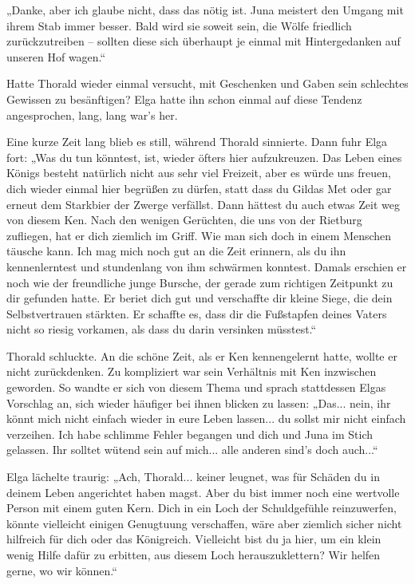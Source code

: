 „Danke, aber ich glaube nicht, dass das nötig ist. Juna meistert den Umgang mit ihrem Stab immer besser. Bald wird sie soweit sein, die Wölfe friedlich zurückzutreiben – sollten diese sich überhaupt je einmal mit Hintergedanken auf unseren Hof wagen.“

Hatte Thorald wieder einmal versucht, mit Geschenken und Gaben sein schlechtes Gewissen zu besänftigen? Elga hatte ihn schon einmal auf diese Tendenz angesprochen, lang, lang war’s her.

Eine kurze Zeit lang blieb es still, während Thorald sinnierte. Dann fuhr Elga fort: „Was du tun könntest, ist, wieder öfters hier aufzukreuzen. Das Leben eines Königs besteht natürlich nicht aus sehr viel Freizeit, aber es würde uns freuen, dich wieder einmal hier begrüßen zu dürfen, statt dass du Gildas Met oder gar erneut dem Starkbier der Zwerge verfällst. Dann hättest du auch etwas Zeit weg von diesem Ken. Nach den wenigen Gerüchten, die uns von der Rietburg zufliegen, hat er dich ziemlich im Griff. Wie man sich doch in einem Menschen täusche kann. Ich mag mich noch gut an die Zeit erinnern, als du ihn kennenlerntest und stundenlang von ihm schwärmen konntest. Damals erschien er noch wie der freundliche junge Bursche, der gerade zum richtigen Zeitpunkt zu dir gefunden hatte. Er beriet dich gut und verschaffte dir kleine Siege, die dein Selbstvertrauen stärkten. Er schaffte es, dass dir die Fußstapfen deines Vaters nicht so riesig vorkamen, als dass du darin versinken müsstest.“

Thorald schluckte. An die schöne Zeit, als er Ken kennengelernt hatte, wollte er nicht zurückdenken. Zu kompliziert war sein Verhältnis mit Ken inzwischen geworden. So wandte er sich von diesem Thema und sprach stattdessen Elgas Vorschlag an, sich wieder häufiger bei ihnen blicken zu lassen: „Das... nein, ihr könnt mich nicht einfach wieder in eure Leben lassen... du sollst mir nicht einfach verzeihen. Ich habe schlimme Fehler begangen und dich und Juna im Stich gelassen. Ihr solltet wütend sein auf mich... alle anderen sind’s doch auch...“

Elga lächelte traurig: „Ach, Thorald... keiner leugnet, was für Schäden du in deinem Leben angerichtet haben magst. Aber du bist immer noch eine wertvolle Person mit einem guten Kern. Dich in ein Loch der Schuldgefühle reinzuwerfen, könnte vielleicht einigen Genugtuung verschaffen, wäre aber ziemlich sicher nicht hilfreich für dich oder das Königreich. Vielleicht bist du ja hier, um ein klein wenig Hilfe dafür zu erbitten, aus diesem Loch herauszuklettern? Wir helfen gerne, wo wir können.“

